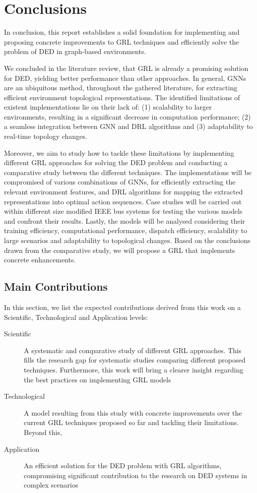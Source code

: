\chapter{Conclusions} \label{chap:conclusions}

In conclusion, this report establishes a solid foundation for implementing and proposing concrete improvements to \ac{GRL} techniques and efficiently solve the problem of \ac{DED} in graph-based environments. \par
We concluded in the literature review, that \ac{GRL} is already a promising solution for \ac{DED}, yielding better performance than other approaches. In general, \acp{GNN} are an ubiquitous method, throughout the gathered literature, for extracting efficient environment topological representations. The identified limitations of existent implementations lie on their lack of: (1) scalability to larger environments, resulting in a significant decrease in computation performance; (2) a seamless integration between \ac{GNN} and \ac{DRL} algorithms and (3) adaptability to real-time topology changes. \par
Moreover, we aim to study how to tackle these limitations by implementing different \ac{GRL} approaches for solving the \ac{DED} problem and conducting a comparative study between the different techniques. The implementations will be compromised of various combinations of \acp{GNN}, for efficiently extracting the relevant environment features, and \ac{DRL} algorithms for mapping the extracted representations into optimal action sequences. Case studies will be carried out within different size modified IEEE bus systems for testing the various models and confront their results. Lastly, the models will be analysed considering their training efficiency, computational performance, dispatch efficiency, scalability to large scenarios and adaptability to topological changes. Based on the conclusions drawn from the comparative study, we will propose a \ac{GRL} that implements concrete enhancements.

\section{Main Contributions}

In this section, we list the expected contributions derived from this work on a Scientific, Technological and Application levels:
\begin{description}
	\item[Scientific] A systematic and comparative study of different \ac{GRL} approaches. This fills the research gap for systematic studies comparing different proposed techniques. Furthermore, this work will bring a clearer insight regarding the best practices on implementing \ac{GRL} models
	\item[Technological] A model resulting from this study with concrete improvements over the current \ac{GRL} techniques proposed so far and tackling their limitations. Beyond this, 
	\item[Application] An efficient solution for the \ac{DED} problem with \ac{GRL} algorithms, compromising significant contribution to the research on \ac{DED} systems in complex scenarios
\end{description}

